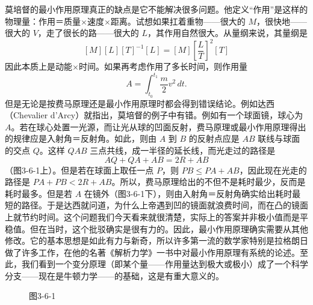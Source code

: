 莫培督的最小作用原理真正的缺点是它不能解决很多问题。他定义“作用”是这样的物理量：作用＝质量$\times$速度$\times$距离。试想如果扛着重物——很大的 $M$，很快地——很大的 $V$，走了很长的路——很大的 $L$，其作用自然很大。从量纲来说，其量纲是
\[
 [M][L][T]^{-1}[L]=[M]\left[\frac{L}{T}\right]^2[T]
\]
因此本质上是动能$\times$时间。如果再考虑作用了多长时间，则作用量
\[
 A=\int_{t_0}^{t_1}\frac{m}{2}v^2\,dt.
\]
但是无论是按费马原理还是最小作用原理时都会得到错误结论。例如达西（Chevalier d'Arcy）就指出，莫培督的例子中有错。例如有一个球面镜，球心为 $A$。若在球心处置一光源，而让光从球的凹面反射，费马原理或最小作用原理得出的规律应是入射角＝反射角。如此，则由 $A$ 到 $B$ 的反射点应是 $AB$ 联线与球面的交点 $Q$。这样 $QAB$ 三点共线，成一半径的延长线，而光走过的路径是
\[
 AQ+QA+AB=2R+AB
\]
（图3-6-1上）。但是若在球面上取任一点 $P$，则 $PB\le PA+AB$，因此现在光走的路径是 $PA+PB<2R+AB$。所以，费马原理给出的不但不是耗时最少，反而是耗时最多。但是若 $A$ 在镜外（图3-6-1下），则由入射角＝反射角确实给出耗时最短的路径。于是达西就问道，为什么上帝遇到凹的镜面就浪费时间，而在凸的镜面上就节约时间。这个问题我们今天看来就很清楚，实际上的答案并非极小值而是平稳值。但在当时，这个批驳确实是很有力的。因此，最小作用原理确实需要从其他修改。它的基本思想是如此有力与新奇，所以许多第一流的数学家特别是拉格朗日做了许多工作，在他的名著《解析力学》一书中对最小作用原理有系统的论述。至此，我们看到一个变分原理（即某个量——作用量达到极大或极小）成了一个科学分支——现在是牛顿力学——的基础，这是有重大意义的。

\begin{figure}[htbp]
\centering
{}
\caption*{图3-6-1}
\end{figure}

